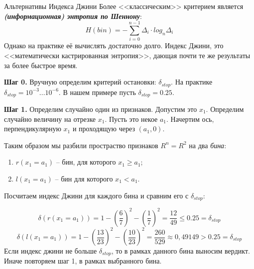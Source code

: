 \documentclass{beamer}
\newcommand{\termdef}[1]{\textbf{\textit{#1}}}
\newcommand{\term}{\textit}
\begin{document}
\begin{frame}{Альтернативы Индекса Джини}
	Более <<классическим>> критерием является 
	\termdef{(информационная) энтропия по Шеннону}:
	\begin{equation}
	H(bin) = - \sum_{i=0}^{n-1} \Delta_i \cdot log_n \Delta_i 
	\end{equation}
	Однако на практике её вычислять достаточно долго. 
	Индекс Джини, это <<математически кастрированная энтропия>>,
	дающая почти те же результаты за более быстрое время.
\end{frame}




\begin{frame}
	\footnotesize
	\textbf{Шаг 0.} Вручную определим критерий остановки: $\delta_{stop}$. На практике $\delta_{stop}=10^{-3}...10^{-6}$. В нашем примере пусть $\delta_{stop}=0.25$. 
	
	\textbf{Шаг 1.} Определим случайно один из признаков. Допустим это $x_1$. 
	Определим случайно величину на отрезке $x_1$. Пусть это некое $a_1$. 
	Начертим ось, перпендикулярную $x_1$ и проходящую через $(a_1, 0)$.
	\begin{center}
		\begin{tikzpicture}[scale=1.5]
		
		\end{tikzpicture}
	\end{center}
	Таким образом мы разбили простраство признаков
	$R^n=R^2$ на два \term{бина}:
	\begin{enumerate}
		\item $r(x_1=a_1)$ -- бин, для которого $x_1 \geqslant a_1$;
		\item $l(x_1=a_1)$ -- бин для которого $x_1 < a_1$.
	\end{enumerate}
\end{frame}

\begin{frame}
	\small
	Посчитаем индекс Джини для каждого бина и сравним его с $\delta_{stop}$:
	\begin{center}
		\begin{tikzpicture}[scale=1.5]
		
		\end{tikzpicture}
	\end{center}
	\begin{equation*}
	\delta \left(r(x_1=a_1)\right) = 
	1 - \left(\frac{6}{7}\right)^2 - \left( \frac{1}{7}\right)^2 =
	\frac{12}{49} \leqslant 0.25 = \delta_{stop}
	\end{equation*}
	\begin{equation*}
	\delta \left(l(x_1=a_1)\right) = 
	1 - \left( \frac{13}{23} \right)^2 - \left( \frac{10}{23} \right)^2 
	= \frac{260}{529} \approx 0,49149 > 0.25 = \delta_{stop}
	\end{equation*}
	Если индекс джини не больше $\delta_{stop}$, то в рамках данного бина выносим 
	вердикт. Иначе повторяем шаг 1, в рамках выбранного бина.
\end{frame}
\end{document}
